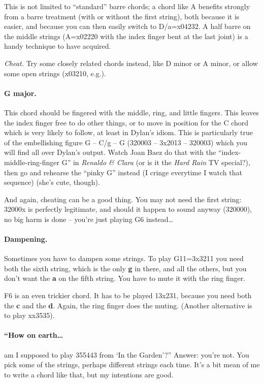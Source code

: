 \begin{articlelayout}
This is not limited to ``{}standard''{} barre chords; a chord like A
benefits strongly from a barre treatment (with or without the first
string), both because it is easier, and because you can then easily
switch to D/a=x04232. A half barre on the middle strings (A=x02220
with the index finger bent at the last joint) is a handy technique to
have acquired.

\emph{Cheat.} Try some closely related chords instead, like D minor or
A minor, or allow some open strings (x03210, e.g.).


\paragraph*{G major.} This chord should be fingered with the middle, ring,
and little fingers. This leaves the index finger free to do other
things, or to move in position for the C chord which is very likely to
follow, at least in Dylan's idiom. This is particularly true of the
embellishing figure G -- C/g -- G (320003 -- 3x2013 -- 320003) which
you will find all over Dylan's output. Watch Joan Baez do that with
the ``{}index-middle-ring-finger G''{} in \emph{Renaldo \& Clara }(or is it the
\emph{Hard Rain }TV special?), then go and rehearse the ``{}pinky
G''{} instead (I cringe everytime I watch that sequence) (she's cute, though).

And again, cheating can be a good thing. You may not need the first
string: 32000x is perfectly legitimate, and should it happen to sound
anyway (320000), no big harm is done -- you're just playing G6
instead\ldots{}


\paragraph*{Dampening.} Sometimes you have to dampen some strings. To play
G11=3x3211 you need both the sixth string, which is the only
\textbf{g} in there, and all the others, but you don't want the
\textbf{a} on the fifth string. You have to mute it with the ring
finger.

F6 is an even trickier chord. It has to be played 13x231, because you
need both the \textbf{c} and the \textbf{d}. Again, the ring finger
does the muting. (Another alternative is to play xx3535).

\paragraph*{``How on earth\ldots} am I supposed to play 355443 from
`In the Garden'?'' Answer: you're not. You pick some of the strings, perhaps
different strings each time. It's a bit mean of me to write a chord
like that, but my intentions are good.


\end{articlelayout}
